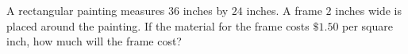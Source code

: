 A rectangular painting measures $36$ inches by $24$ inches. A frame $2$ inches wide is placed around the painting. If the material for the frame costs $\$1.50$ per square inch, how much will the frame cost?

